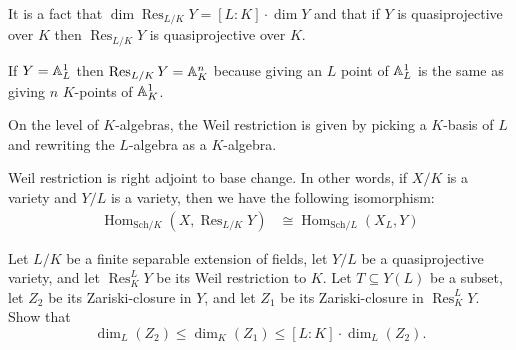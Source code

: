\documentclass[12pt]{article}
\begin{document}
It is a fact that $\dim \operatorname{Res}_{L/K} Y = [L:K] \cdot \dim Y$ and that if $Y$ is quasiprojective over $K$ then $\operatorname{Res}_{L/K} Y$ is quasiprojective over $K$. \begin{example}
    If $Y = \mathbb{A}^1_L$ then $\operatorname{Res}_{L/K} Y = \mathbb{A}^n_K$ because giving an $L$ point of $\mathbb{A}^1_L$ is the same as giving $n$ $K$-points of $\mathbb{A}^1_K$. 
\end{example} On the level of $K$-algebras, the Weil restriction is given by picking a $K$-basis of $L$ and rewriting the $L$-algebra as a $K$-algebra. 

\begin{proposition}
    Weil restriction is right adjoint to base change. In other words, if $X/K$ is a variety and $Y/L$ is a variety, then we have the following isomorphism:
    \begin{align*}
        \operatorname{Hom}_{\text{Sch}/K}(X, \operatorname{Res}_{L/K} Y) &\cong \operatorname{Hom}_{\text{Sch}/L}(X_L, Y) 
    \end{align*}
\end{proposition}

\begin{proposition}
     Let \( L/K \) be a finite separable extension of fields, let \( Y/L \) be a quasiprojective variety, and let \( \operatorname{Res}^L_K Y \) be its Weil restriction to \( K \). Let \( T \subseteq Y(L) \) be a subset, let \( Z_2 \) be its Zariski-closure in \( Y \), and let \( Z_1 \) be its Zariski-closure in \( \operatorname{Res}^L_K Y \). Show that
    \[
    \dim_L(Z_2) \leq \dim_K(Z_1) \leq [L:K] \cdot \dim_L(Z_2).
    \]
\end{proposition}
\end{document}
